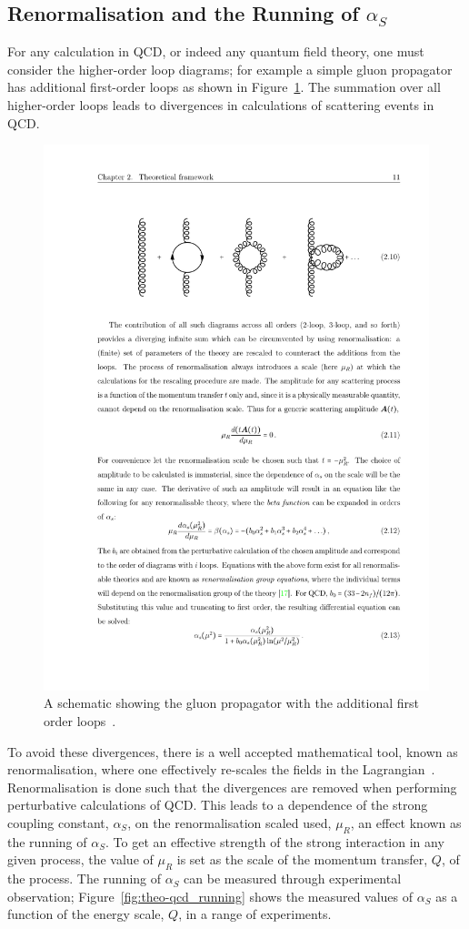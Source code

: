 \subsection{Renormalisation and the Running of $\alpha_S$}
\label{sec:theo-qcd_dijet_running}

For any calculation in QCD, or indeed any quantum field theory, one must consider the higher-order loop diagrams;
for example a simple gluon propagator has additional first-order loops as shown in Figure~\ref{fig:theo-qcd_gluon}.
The summation over all higher-order loops leads to divergences in calculations of scattering events in QCD.

\begin{figure}[!hbt]
  \begin{center}
    \includegraphics[width=0.6\linewidth, angle=0]{figs/Theory/qcd_gluon_loop.pdf}
  \end{center}
  \vspace{-1em}
  \caption[A schematic showing the gluon propagator with the additional first order loops.]
  {A schematic showing the gluon propagator with the additional first order loops~\cite{det-thesis_kate}.}
  \label{fig:theo-qcd_gluon}
\end{figure}

To avoid these divergences, there is a well accepted mathematical tool, known as renormalisation,
where one effectively re-scales the fields in the Lagrangian~\cite{theo-qcd}.
Renormalisation is done such that the divergences are removed
when performing perturbative calculations of QCD.
This leads to a dependence of the strong coupling constant, $\alpha_S$, on the renormalisation scaled used, $\mu_R$,
an effect known as the running of $\alpha_S$.
To get an effective strength of the strong interaction in any given process,
the value of $\mu_R$ is set as the scale of the momentum transfer, $Q$, of the process.
The running of $\alpha_{S}$ can be measured through experimental observation;
Figure~\ref{fig:theo-qcd_running} shows the measured values of $\alpha_S$
as a function of the energy scale, $Q$, in a range of experiments.

